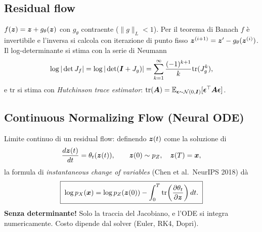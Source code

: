 \subsection{Residual flow}
$f(\bm{z}) = \bm{z} + g_\theta(\bm{z})$ con $g_\theta$ contraente ($\|g\|_L < 1$). Per il teorema di Banach $f$ è invertibile e l'inversa si calcola con iterazione di punto fisso $\bm{z}^{(i+1)} = \bm{z}' - g_\theta(\bm{z}^{(i)})$. Il log-determinante si stima con la serie di Neumann
\[
\log |\det J_f| = \log|\det(\bm{I} + J_g)| = \sum_{k=1}^\infty \frac{(-1)^{k+1}}{k} \mathrm{tr}(J_g^k),
\]
e $\mathrm{tr}$ si stima con \emph{Hutchinson trace estimator}: $\mathrm{tr}(\bm{A}) = \mathbb{E}_{\boldsymbol{\epsilon}\sim\mathcal{N}(0,\bm{I})}[\boldsymbol{\epsilon}^\top \bm{A} \boldsymbol{\epsilon}]$.

\subsection{Continuous Normalizing Flow (Neural ODE)}
Limite continuo di un residual flow: definendo $\bm{z}(t)$ come la soluzione di
\[
\frac{d\bm{z}(t)}{dt} = \theta_t(\bm{z}(t)),\qquad \bm{z}(0) \sim p_Z,\quad \bm{z}(T) = \bm{x},
\]
la formula di \emph{instantaneous change of variables} (Chen et al.\ NeurIPS 2018) dà
\[
\boxed{\;\log p_X(\bm{x}) = \log p_Z(\bm{z}(0)) - \int_0^T \mathrm{tr}\!\left(\frac{\partial \theta_t}{\partial \bm{z}}\right) dt.\;}
\]
\textbf{Senza determinante!} Solo la traccia del Jacobiano, e l'ODE si integra numericamente. Costo dipende dal solver (Euler, RK4, Dopri).

